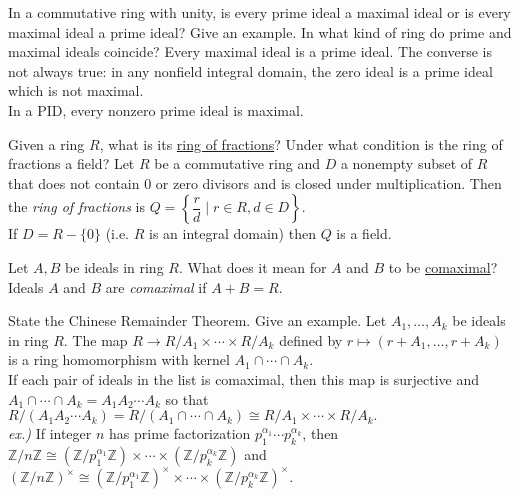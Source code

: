 \documentclass[avery5371,grid]{flashcards}
\newcommand{\Z}{\mathbb{Z}}
\begin{document}
\begin{flashcard}[Rings]{In a commutative ring with unity, is every prime ideal a maximal ideal or is every maximal ideal a prime ideal? Give an example. In what kind of ring do prime and maximal ideals coincide?}
 Every maximal ideal is a prime ideal. The converse is not always true: in any nonfield integral domain, the zero ideal is a prime ideal which is not maximal.\\
 
 In a PID, every nonzero prime ideal is maximal.
\end{flashcard}

\begin{flashcard}[Rings]{Given a ring $R$, what is its \underline{ring of fractions}? Under what condition is the ring of fractions a field?}
 Let $R$ be a commutative ring and $D$ a nonempty subset of $R$ that does not contain 0 or zero divisors and is closed under multiplication. Then the \emph{ring of fractions} is $Q = \left \{ \dfrac{r}{d} \mid r \in R, d \in D \right \}$.\\
 
 If $D = R - \{0\}$ (i.e. $R$ is an integral domain) then $Q$ is a field.
\end{flashcard}

\begin{flashcard}[Rings]{Let $A,B$ be ideals in ring $R$. What does it mean for $A$ and $B$ to be \underline{comaximal}?}
 Ideals $A$ and $B$ are \emph{comaximal} if $A+B=R$.
\end{flashcard}

\begin{flashcard}[Rings]{State the Chinese Remainder Theorem. Give an example.}
 Let $A_1, \ldots, A_k$ be ideals in ring $R$. The map $R \to R/A_1 \times \cdots \times R/A_k$ defined by $r \mapsto (r + A_1, \ldots, r + A_k)$ is a ring homomorphism with kernel $A_1 \cap \cdots \cap A_k$.\\
 
 If each pair of ideals in the list is comaximal, then this map is surjective and $A_1 \cap \cdots \cap A_k = A_1A_2 \cdots A_k$ so that $R/(A_1A_2 \cdots A_k) = R/(A_1 \cap \cdots \cap A_k) \cong R/A_1 \times \cdots \times R/A_k.$\\
 
 \emph{ex.)} If integer $n$ has prime factorization $p_1^{\alpha_1} \cdots p_k^{\alpha_k}$, then $\Z/n\Z \cong (\Z/p_1^{\alpha_1}\Z) \times \cdots \times (\Z/p_k^{\alpha_k}\Z)$ and $(\Z/n\Z)^\times \cong (\Z/p_1^{\alpha_1}\Z)^\times \times \cdots \times (\Z/p_k^{\alpha_k}\Z)^\times.$
\end{flashcard}
\end{document}
